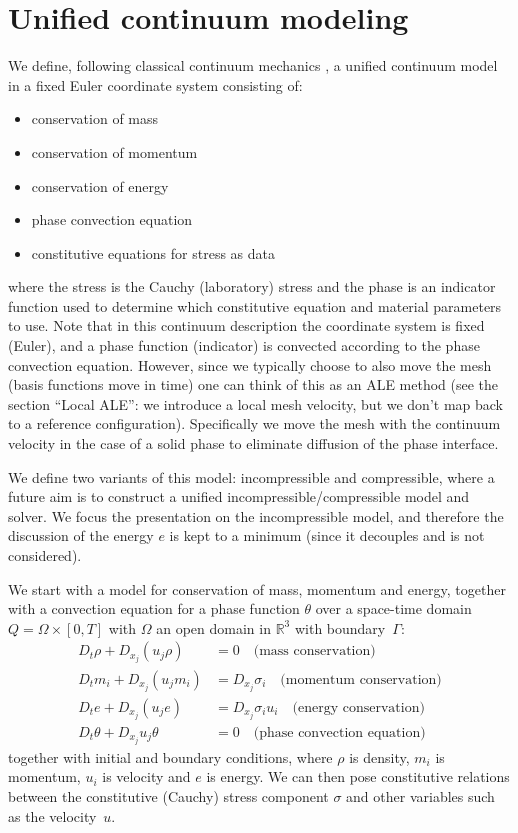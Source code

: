 \section{Unified continuum modeling}

We define, following classical continuum mechanics \citep{Gurtin1981}, a
unified continuum model in a fixed Euler coordinate system consisting of:
\begin{itemize}
\item conservation of mass

\item conservation of momentum

\item conservation of energy

\item phase convection equation

\item constitutive equations for stress as data
\end{itemize}
where the stress is the Cauchy (laboratory) stress and the phase is an
indicator function used to determine which constitutive equation and
material parameters to use. Note that in this continuum description the
coordinate system is fixed (Euler), and a phase function (indicator) is
convected according to the phase convection equation. However, since we
typically choose to also move the mesh (basis functions move in time)
one can think of this as an ALE method (see the section ``Local ALE'':
we introduce a local mesh velocity, but we don't map back to a reference
configuration). Specifically we move the mesh with the continuum
velocity in the case of a solid phase to eliminate diffusion of the
phase interface.

We define two variants of this model: incompressible and compressible,
where a future aim is to construct a unified incompressible/compressible
model and solver. We focus the presentation on the incompressible model,
and therefore the discussion of the energy $e$ is kept to a minimum
(since it decouples and is not considered).

We start with a model for conservation of mass, momentum and energy,
together with a convection equation for a phase function $\theta$ over
a space-time domain $Q = \Omega \times [0, T]$ with $\Omega$ an open
domain in $\mathbb{R}^3$ with boundary~$\Gamma$:
\begin{align}
    D_t \rho + D_{x_j} (u_j \rho) &= 0 \quad \text{(mass conservation)}
\\
    D_t m_i + D_{x_j} (u_j m_i) &= D_{x_j} \sigma_i \quad \text{(momentum conservation)}
\\
    D_t e + D_{x_j} (u_j e) &= D_{x_j} \sigma_i u_i \quad \text{(energy conservation)}
\\
    D_t \theta + D_{x_j} u_j \theta &= 0 \quad \text{(phase convection equation)}
\end{align}
together with initial and boundary conditions, where $\rho$ is density,
$m_i$ is momentum, $u_i$ is velocity and $e$ is energy. We can then
pose constitutive relations between the constitutive (Cauchy) stress
component $\sigma$ and other variables such as the velocity~$u$.

